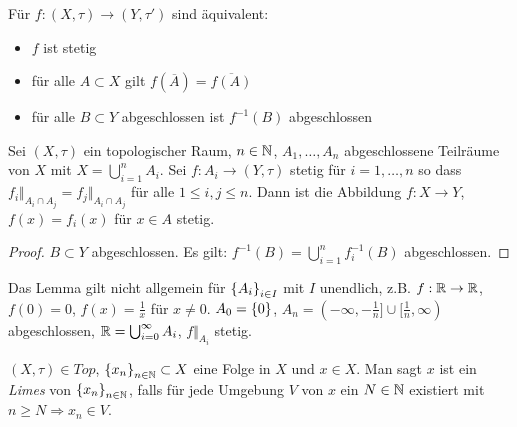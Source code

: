 \documentclass{skript}
\begin{document}
\begin{stz}
    Für $f:(X,\tau)\to(Y,\tau')$ sind äquivalent:
    \begin{itemize}
        \item $f$ ist stetig
        \item für alle $A\subset X$ gilt $f(\overline{A}) = \overline{f(A)}$
        \item für alle $B\subset Y$ abgeschlossen ist $f^{-1}(B)$ abgeschlossen
    \end{itemize}
\end{stz}

\begin{lem}
    Sei $(X,\tau)$ ein topologischer Raum, $n\in\mathbb{N}$, $A_1,\ldots,A_n$ abgeschlossene
    Teilräume von $X$ mit $X=\bigcup_{i=1}^n A_i$. Sei $f:A_i\to(Y,\tau)$ stetig
    für $i = 1, \ldots, n$ so dass $f_i\Vert_{A_i\cap A_j}=f_j\Vert_{A_i\cap A_j}$
    für alle $1\leq i, j \leq n$. Dann ist die Abbildung $f : X \to Y$, $f(x) = f_i(x)$
    für $x\in A$ stetig.
    \begin{proof}
        $B\subset Y$ abgeschlossen. Es gilt: $f^{-1}(B) = \bigcup_{i=1}^n f^{-1}_i(B)$
        abgeschlossen.
    \end{proof}
    \begin{bem}
        Das Lemma gilt nicht allgemein für $\mdef{A_i}_{i\in I}$ mit $I$ unendlich,
        z.B. $f:\mathbb{R}\to\mathbb{R}$, $f(0) = 0$, $f(x) = \frac{1}{x}$ für $x\neq 0$.
        $A_0 = \mdef{0}$, $A_n = (-\infty,-\frac 1n]\cup[\frac 1n, \infty)$
        abgeschlossen, $\mathbb{R}=\bigcup_{i=0}^\infty A_i$, $f\Vert_{A_i}$ stetig.
    \end{bem}
\end{lem}

\begin{dfn}
    $(X,\tau)\in Top$, $\mdef{x_n}_{n\in\N}\subset X$ eine Folge in $X$ und $x\in X$.
    Man sagt $x$ ist ein \emph{Limes} von $\mdef{x_n}_{n\in\N}$, falls für jede
    Umgebung $V$ von $x$ ein $N\in\mathbb{N}$ existiert mit $n\geq N\Rightarrow x_n\in V$.
\end{dfn}
\end{document}
